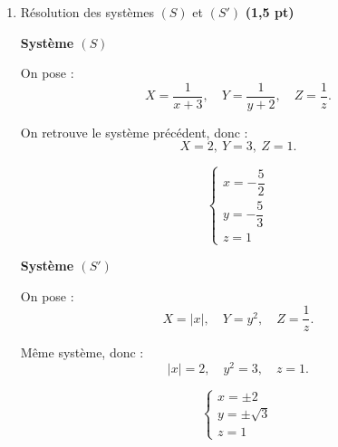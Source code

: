 \documentclass[12pt,a4paper]{article}
\begin{document}
\begin{enumerate}
\begin{enumerate}
\[
\begin{cases}
x+2y+z=11 \\
2x+y-z=1 \\
4x-3y+z=7
\end{cases}
\]

\[
\boxed{(x,y,z)=(2,3,1)}
\]

\item Résolution des systèmes $(S)$ et $(S')$ \hfill \textbf{(1,5 pt)}

\textbf{Système $(S)$}

On pose :
\[
X=\frac{1}{x+3},\quad Y=\frac{1}{y+2},\quad Z=\frac{1}{z}.
\]

On retrouve le système précédent, donc :
\[
X=2,\ Y=3,\ Z=1.
\]

\[
\boxed{
\begin{cases}
x=-\dfrac{5}{2} \\
y=-\dfrac{5}{3} \\
z=1
\end{cases}}
\]

\textbf{Système $(S')$}

On pose :
\[
X=|x|,\quad Y=y^2,\quad Z=\frac{1}{z}.
\]

Même système, donc :
\[
|x|=2,\quad y^2=3,\quad z=1.
\]

\[
\boxed{
\begin{cases}
x=\pm2 \\
y=\pm\sqrt3 \\
z=1
\end{cases}}
\]

\end{enumerate}

\end{enumerate}
\end{document}
